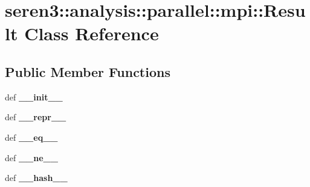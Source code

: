 \hypertarget{classseren3_1_1analysis_1_1parallel_1_1mpi_1_1Result}{
\section{seren3::analysis::parallel::mpi::Result Class Reference}
\label{classseren3_1_1analysis_1_1parallel_1_1mpi_1_1Result}
}
\subsection*{Public Member Functions}
\begin{DoxyCompactItemize}
\item 
\hypertarget{classseren3_1_1analysis_1_1parallel_1_1mpi_1_1Result_a64b5638b66017645c42bec256dd58f95}{
def {\bfseries \_\-\_\-init\_\-\_\-}}
\label{classseren3_1_1analysis_1_1parallel_1_1mpi_1_1Result_a64b5638b66017645c42bec256dd58f95}

\item 
\hypertarget{classseren3_1_1analysis_1_1parallel_1_1mpi_1_1Result_a4346441d71dc534b42498544faee00a3}{
def {\bfseries \_\-\_\-repr\_\-\_\-}}
\label{classseren3_1_1analysis_1_1parallel_1_1mpi_1_1Result_a4346441d71dc534b42498544faee00a3}

\item 
\hypertarget{classseren3_1_1analysis_1_1parallel_1_1mpi_1_1Result_af7862b9dc29c5dc30482f04372ea1dc1}{
def {\bfseries \_\-\_\-eq\_\-\_\-}}
\label{classseren3_1_1analysis_1_1parallel_1_1mpi_1_1Result_af7862b9dc29c5dc30482f04372ea1dc1}

\item 
\hypertarget{classseren3_1_1analysis_1_1parallel_1_1mpi_1_1Result_a74d8ab0902d414aa7d9ce3b7055b67a0}{
def {\bfseries \_\-\_\-ne\_\-\_\-}}
\label{classseren3_1_1analysis_1_1parallel_1_1mpi_1_1Result_a74d8ab0902d414aa7d9ce3b7055b67a0}

\item 
\hypertarget{classseren3_1_1analysis_1_1parallel_1_1mpi_1_1Result_a1f79badced6558a563c7d1090070a05c}{
def {\bfseries \_\-\_\-hash\_\-\_\-}}
\label{classseren3_1_1analysis_1_1parallel_1_1mpi_1_1Result_a1f79badced6558a563c7d1090070a05c}

\end{DoxyCompactItemize}
